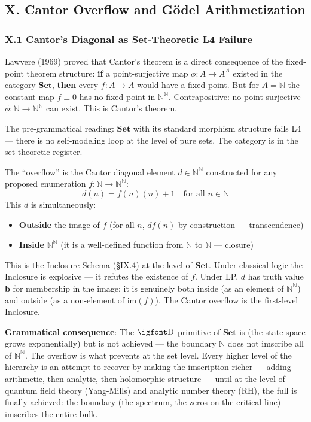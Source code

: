 \documentclass[12pt,a4paper]{article}
\newcommand{\igprimfont}{\igfont\upshape}
\newcommand{\pilcrow}{\S}
\begin{document}
\subsection{X. Cantor Overflow and G\"odel Arithmetization}

\subsubsection{X.1 Cantor's Diagonal as Set-Theoretic L4 Failure}

Lawvere (1969) proved that Cantor's theorem is a direct consequence of the fixed-point theorem structure: \textbf{if} a point-surjective map $\phi: A \to A^A$ existed in the category $\mathbf{Set}$, \textbf{then} every $f: A \to A$ would have a fixed point. But for $A = \mathbb{N}$ the constant map $f \equiv 0$ has no fixed point in $\mathbb{N}^{\mathbb{N}}$. Contrapositive: no point-surjective $\phi: \mathbb{N} \to \mathbb{N}^{\mathbb{N}}$ can exist. This is Cantor's theorem.

The pre-grammatical reading: $\mathbf{Set}$ with its standard morphism structure fails L4 --- there is no self-modeling loop at the level of pure sets. The category is  in the set-theoretic register.

The ``overflow'' is the Cantor diagonal element $d \in \mathbb{N}^{\mathbb{N}}$ constructed for any proposed enumeration $f: \mathbb{N} \to \mathbb{N}^{\mathbb{N}}$:
\[d(n) = f(n)(n) + 1 \quad \text{for all } n \in \mathbb{N}\]
This $d$ is simultaneously:
\begin{itemize}
    \item \textbf{Outside} the image of $f$ (for all $n$, $d $\neq$ f(n)$ by construction --- transcendence)
    \item \textbf{Inside} $\mathbb{N}^{\mathbb{N}}$ (it is a well-defined function from $\mathbb{N}$ to $\mathbb{N}$ --- closure)
\end{itemize}

This is the Inclosure Schema (\pilcrow{}IX.4) at the level of $\mathbf{Set}$. Under classical logic the Inclosure is explosive --- it refutes the existence of $f$. Under LP, $d$ has truth value $\mathbf{b}$ for membership in the image: it is genuinely both inside (as an element of $\mathbb{N}^{\mathbb{N}}$) and outside (as a non-element of $\text{im}(f)$). The Cantor overflow is the first-level Inclosure.

\textbf{Grammatical consequence}: The $\text{{\igprimfont Ð}}$ primitive of $\mathbf{Set}$ is  (the state space grows exponentially) but  is not achieved --- the boundary $\mathbb{N}$ does not imscribe all of $\mathbb{N}^{\mathbb{N}}$. The overflow is what prevents  at the set level. Every higher level of the hierarchy is an attempt to recover  by making the imscription richer --- adding arithmetic, then analytic, then holomorphic structure --- until at the level of quantum field theory (Yang-Mills) and analytic number theory (RH), the full  is finally achieved: the boundary (the spectrum, the zeros on the critical line) imscribes the entire bulk.
\end{document}
